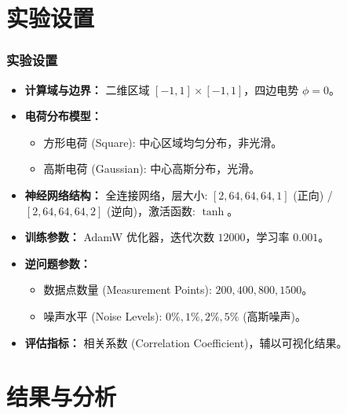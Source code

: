 \documentclass[aspectratio=169]{ctexbeamer}
\begin{document}
\section{实验设置}
\begin{frame}
  \frametitle{实验设置}
  \begin{itemize}
    \item \textbf{计算域与边界：} 二维区域 $[-1, 1] \times [-1, 1]$，四边电势 $\phi = 0$。
    \item \textbf{电荷分布模型：}
        \begin{itemize}
            \item 方形电荷 (Square): 中心区域均匀分布，非光滑。
            \item 高斯电荷 (Gaussian): 中心高斯分布，光滑。
        \end{itemize}
    \item \textbf{神经网络结构：} 全连接网络，层大小: $[2, 64, 64, 64, 1]$ (正向) / $[2, 64, 64, 64, 2]$ (逆向)，激活函数: $\tanh$。
    \item \textbf{训练参数：} AdamW 优化器，迭代次数 $12000$，学习率 $0.001$。
    \item \textbf{逆问题参数：}
        \begin{itemize}
            \item 数据点数量 (Measurement Points): $200, 400, 800, 1500$。
            \item 噪声水平 (Noise Levels): $0\%, 1\%, 2\%, 5\%$ (高斯噪声)。
        \end{itemize}
    \item \textbf{评估指标：} 相关系数 (Correlation Coefficient)，辅以可视化结果。
  \end{itemize}
\end{frame}

\section{结果与分析}
\end{document}
